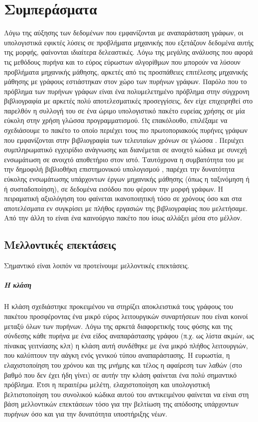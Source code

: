 \chapter{Συμπεράσματα}
\label{chap5}
Λόγω της αύξησης των δεδομένων που εμφανίζονται με αναπαράσταση γράφων, οι υπολογιστικά εφικτές λύσεις σε προβλήματα μηχανικής που εξετάζουν δεδομένα αυτής της μορφής, φαίνονται ιδιαίτερα δελεαστικές.
Λόγω της μεγάλης ανάλυσης που αφορά τις μεθόδους πυρήνα και το εύρος εύρωστων αλγορίθμων που μπορούν να λύσουν προβλήματα μηχανικής μάθησης, αρκετές από τις προσπάθειες επιτέλεσης μηχανικής μάθησης με γράφους εστιάστηκαν στον χώρο των πυρήνων γράφων.
Παρόλο που το πρόβλημα των πυρήνων γράφων είναι ένα πολυμελετημένο πρόβλημα στην σύγχρονη βιβλιογραφία με αρκετές πολύ αποτελεσματικές προσεγγίσεις, δεν είχε επιχειρηθεί στο παρελθόν η συλλογή του σε ένα ώριμο υπολογιστικό πακέτο ευρείας χρήσης σε μία εύκολη στην χρήση γλώσσα προγραμματισμού.
Ως επακόλουθο, επιλέξαμε να σχεδιάσουμε το πακέτο  το οποίο περιέχει τους πιο πρωτοποριακούς πυρήνες γράφων που εμφανίζονται στην βιβλιογραφία των τελευταίων χρόνων σε γλώσσα .
Περιέχει συμπληρωματικό εγχειρίδιο ανάγνωσης και διανέμεται σε ανοιχτό κώδικα με συνεχή ενσωμάτωση σε ανοιχτό αποθετήριο στον ιστό.
Ταυτόχρονα η συμβατότητα του με την δημοφιλή βιβλιοθήκη επιστημονικού υπολογισμού , παρέχει την δυνατότητα εύκολης ενσωμάτωσης υπάρχοντων έργων μηχανικής μάθησης (όπως η ταξινόμηση ή ή συσταδοποίηση), σε δεδομένα εισόδου που φέρουν την μορφή γράφων.
Η πειραματική αξιολόγηση του  φαίνεται ικανοποιητική τόσο σε χρόνους όσο και στα αποτελέσματα εν συγκρίσει με πλήθος εργασιών της βιβλιογραφίας που μελετήσαμε.
Από την άλλη το  είναι ένα καινούργιο πακέτο που ίσως αλλάξει μέσα στο μέλλον.
\section{Μελλοντικές επεκτάσεις}
Σημαντικό είναι λοιπόν να προτείνουμε μελλοντικές επεκτάσεις.
\paragraph*{Η κλάση }
Η κλάση  σχεδιάστηκε προκειμένου να στηρίζει αποκλειστικά τους γράφους του πακέτου προσφέροντας ένα μικρό εύρος λειτουργικών συναρτήσεων που είναι κοινοί μεταξύ όλων των πυρήνων.
Λόγω της αρκετά διαφορετικής τους φύσης και της σύνδεσης κάθε πυρήνα με ένα είδος αναπαράστασης γράφου (π.χ. ως λίστα ακμών, ως πίνακας γειτνίασης κλπ) η κλάση αυτή συνδέθηκε με ένα μικρό πλήθος λειτουργιών, που καλύπτουν την αάγκη ενός γενικού τύπου αναπαράστασης.
Η ευρωστία, η ελαχιστοποίηση του χρόνου και της μνήμης και τέλος η αφαίρεση των λαθών (στο βαθμό που δεν έχει ήδη γίνει) σε αυτήν την κλάση φαίνεται ένα πολύ σημαντικό πρόβλημα.
Έτσι η περαιτέρω μελέτη, ελαχιστοποίηση και υπολογιστική βελτιστοποίηση του συνολικού κώδικα αυτού του αντικειμένου φαίνεται να είναι στη βάση μελλοντικών επεκτάσεων τόσο για την βελτίωση της απόδοσης υπάρχοντων πυρήνων όσο και για την δυνατότητα υποστήριξης νέων.
